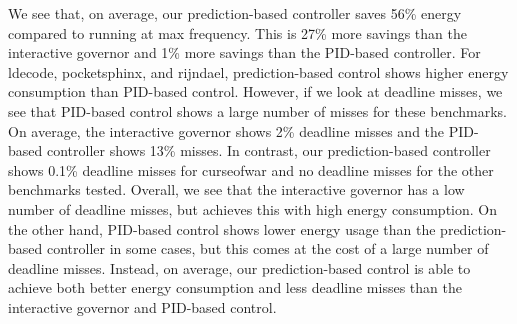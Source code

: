 We see that, on average, our prediction-based controller saves 56\% energy
compared to running at max frequency. This is 27\% more savings than the
interactive governor and 1\% more savings than the PID-based controller.  For
ldecode, pocketsphinx, and rijndael, prediction-based control shows higher
energy consumption than PID-based control. However, if we look at deadline
misses, we see that PID-based control shows a large number of misses for these
benchmarks. On average, the interactive governor shows 2\% deadline misses and
the PID-based controller shows 13\% misses. In contrast, our prediction-based
controller shows 0.1\% deadline misses for curseofwar and no deadline misses
for the other benchmarks tested. Overall, we see that the interactive governor
has a low number of deadline misses, but achieves this with high energy
consumption. On the other hand, PID-based control shows lower energy usage than
the prediction-based controller in some cases, but this comes at the cost of a
large number of deadline misses. Instead, on average, our prediction-based
control is able to achieve both better energy consumption and less deadline
misses than the interactive governor and PID-based control.

